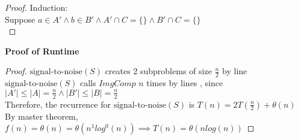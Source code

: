 \begin{problem}
\begin{proof}
    Induction: \\
    Suppose $a \in A' \land b \in B' \land A' \cap C = \{\} \land B' \cap C = \{\}$ \\
  \end{proof}
  \noindent
  \textbf{Proof of Runtime}
  \begin{proof}
    $\text{signal-to-noise}(S)$ creates 2 subproblems of size $\frac{n}{2}$ by line \\%
    $\text{signal-to-noise}(S)$ calls $ImgComp$ $n$ times by lines , since $|A'| \leq |A| = \frac{n}{2} \land |B'| \leq |B| = \frac{n}{2}$\\%
    Therefore, the recurrence for $\text{signal-to-noise}(S)$ is $T(n) = 2T(\frac{n}{2}) + \theta(n)$
    By master theorem, $f(n) = \theta(n) = \theta(n^1log^0(n)) \implies T(n) = \theta(nlog(n))$
  \end{proof}
\end{problem}
